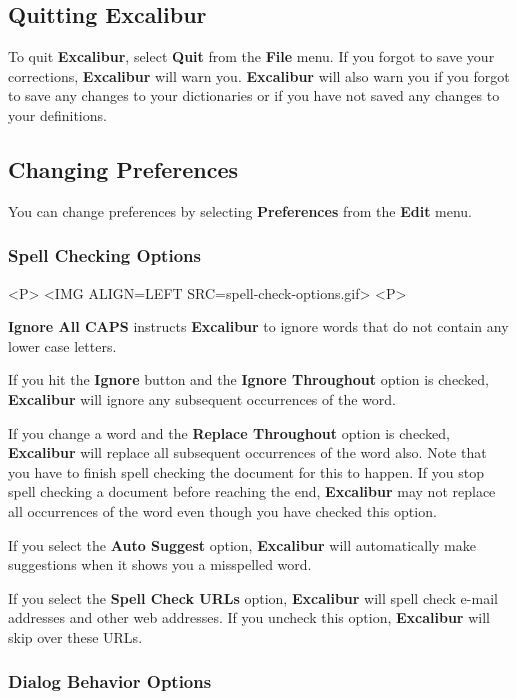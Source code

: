 ﻿\documentclass[11pt,titlepage]{article}
\newcommand{\ex}{\textbf{Excalibur}}
\begin{document}
\subsection{Quitting Excalibur}

To quit \ex, select \textbf{Quit} from the \textbf{File} menu. If you
forgot to save your corrections, \ex{} will warn you. \ex{} will also
warn you if you forgot to save any changes to your dictionaries or if
you have not saved any changes to your definitions.

\subsection{Changing Preferences}

You can change preferences by selecting \textbf{Preferences} from the
\textbf{Edit} menu.

\subsubsection{Spell Checking Options}
\label{sec:spell-check-options}

\begin{rawhtml}
<P>
<IMG ALIGN=LEFT SRC=spell-check-options.gif>
<P>
\end{rawhtml}

\textbf{Ignore All CAPS} instructs \ex{} to ignore words that do not
contain any lower case letters.

If you hit the \textbf{Ignore} button and the \textbf{Ignore
  Throughout} option is checked, \ex{} will ignore any subsequent
occurrences of the word.

If you change a word and the \textbf{Replace Throughout} option is
checked, \ex{} will replace all subsequent occurrences of the word
also.  Note that you have to finish spell checking the document for
this to happen.  If you stop spell checking a document before reaching
the end, \ex{} may not replace all occurrences of the word even though
you have checked this option.

If you select the \textbf{Auto Suggest} option, \ex{} will
automatically make suggestions when it shows you a misspelled word.

If you select the \textbf{Spell Check URLs} option, \ex{} will spell
check e-mail addresses and other web addresses.  If you uncheck this
option, \ex{} will skip over these URLs.

\subsubsection{Dialog Behavior Options}
\end{document}
